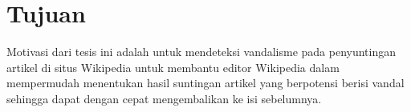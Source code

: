 \section{Tujuan}\label{sec:tujuan}

Motivasi dari tesis ini adalah untuk mendeteksi vandalisme pada penyuntingan
artikel di situs Wikipedia untuk membantu editor Wikipedia dalam mempermudah
menentukan hasil suntingan artikel yang berpotensi berisi vandal sehingga dapat
dengan cepat mengembalikan ke isi sebelumnya.